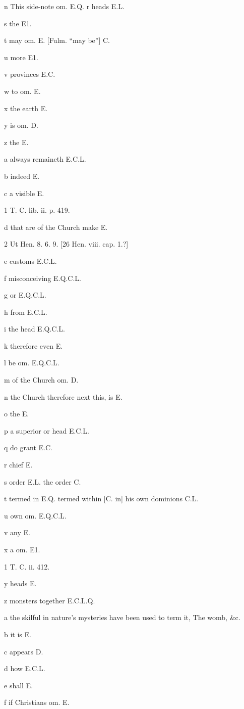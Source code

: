 n This side-note om. E.Q.
r
heads E.L.

s
the E1.

t
may om. E. [Fulm. “may be”] C.

u
more E1.

v
provinces E.C.

w
to om. E.

x
the earth E.

y
is om. D.

z
the E.

a
always remaineth E.C.L.

b
indeed E.

c
a visible E.

1
T. C. lib. ii. p. 419.

d
that are of the Church make E.

2
Ut Hen. 8. 6. 9. [26 Hen. viii. cap. 1.?]

e
customs E.C.L.

f
misconceiving E.Q.C.L.

g
or E.Q.C.L.

h
from E.C.L.

i
the head E.Q.C.L.

k
therefore even E.

l
be om. E.Q.C.L.

m
of the Church om. D.

n
the Church therefore next this, is E.

o
the E.

p
a superior or head E.C.L.

q
do grant E.C.

r
chief E.

s
order E.L. the order C.

t
termed in E.Q. termed within [C. in] his own dominions C.L.

u
own om. E.Q.C.L.

v
any E.

x
a om. E1.

1
T. C. ii. 412.

y
heads E.

z
monsters together E.C.L.Q.

a
the skilful in nature’s mysteries have been used to term it, The womb, &c.

b
it is E.

c
appears D.

d
how E.C.L.

e
shall E.

f
if Christians om. E.

